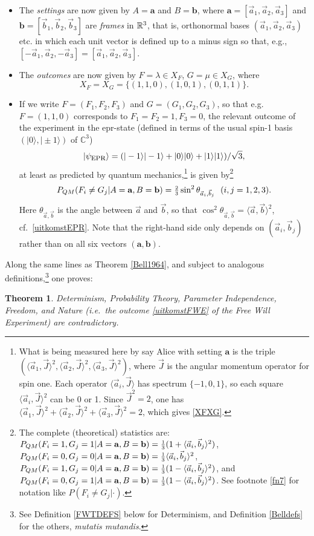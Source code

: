 \documentclass[12pt]{article}
\newtheorem{Theorem}[Definition]{Theorem}
\newcommand{\epr}{{\sc epr}}
\newcommand{\tthird}{\mbox{\footnotesize $\frac{2}{3}$}}
\newcommand{\third}{\mbox{\footnotesize $\frac{1}{3}$}}
\newcommand{\beq}{\begin{equation}}
\newcommand{\eeq}{\end{equation}}
\newcommand{\qm}{quantum mechanics}
\newcommand{\la}{\langle} \newcommand{\ra}{\rangle}
\newcommand{\er}{\eqref}
\newcommand{\lm}{\lambda} \newcommand{\Lm}{\Lambda}
\newcommand{\C}{{\mathbb C}} \newcommand{\D}{{\mathbb D}}
\newcommand{\ba}{\mathbf{a}}\newcommand{\bb}{\mathbf{b}}
\begin{document}
\begin{itemize}
\item The \emph{settings} are now given by $A=\ba$ and $B=\bb$, where
$\ba=[\vec{a}_1,\vec{a}_2,\vec{a}_3]$ and  $\bb=[\vec{b}_1,\vec{b}_2,\vec{b}_3]$
 are \emph{frames} in ${\mathbb R}^3$, that is, orthonormal bases $(\vec{a}_1,\vec{a}_2,\vec{a}_3)$ etc. in which each unit vector is defined up to a minus sign so that, e.g., $[-\vec{a}_1,\vec{a}_2,-\vec{a}_3]=[\vec{a}_1,\vec{a}_2,\vec{a}_3]$.
\item The \emph{outcomes} are now given by $F=\lm\in X_F$, $G=\mu\in X_G$, where
\begin{equation}
X_F=X_G=\{(1,1,0), (1,0,1), (0,1,1)\}. \label{XFXG}
\end{equation}
\item If we write $F=(F_1,F_2,F_3)$ and $G=(G_1,G_2,G_3)$, so that e.g.\ $F=(1,1,0)$ corresponds to $F_1=F_2=1, F_3=0$, the relevant outcome of the experiment in the \epr-state (defined in terms of the usual spin-1 basis $(|0\ra,|\pm 1\ra)$ of $\C^3$)
\beq|\psi_{\mbox{\sc epr}}\ra=(|-1\ra|-1\ra+|0\ra|0\ra+|1\ra|1\ra)/\sqrt{3},\eeq
at least as predicted by \qm,\footnote{What is being measured here by say Alice with setting $\ba$ is the triple
$(\la\vec{a}_1,\vec{J}\ra^2,\la\vec{a}_2,\vec{J}\ra^2,\la\vec{a}_3,\vec{J}\ra^2)$, where $\vec{J}$ is the angular momentum operator for spin one. Each operator $\la\vec{a}_i,\vec{J}\ra$ has spectrum $\{-1, 0,1\}$, so  each square $\la\vec{a}_i,\vec{J}\ra^2$ can be 0 or 1. Since $\vec{J}^2=2$, one has
$\la\vec{a}_1,\vec{J}\ra^2+\la\vec{a}_2,\vec{J}\ra^2+\la\vec{a}_3,\vec{J}\ra^2=2$, which gives \er{XFXG}.
}  is given by\footnote{
The complete (theoretical) statistics  are:  $P_{QM}(F_i=1,G_j=1|A=\ba,B=\bb) =\third(1+\la\vec{a}_i,\vec{b}_j\ra^2)$,\\
$P_{QM}(F_i=0,G_j=0|A=\ba,B=\bb)= \third\la\vec{a}_i,\vec{b}_j\ra^2$, 
$P_{QM}(F_i=1,G_j=0|A=\ba,B=\bb)=  \third(1-\la\vec{a}_i,\vec{b}_j\ra^2)$, and 
$P_{QM}(F_i=0,G_j=1|A=\ba,B=\bb)= \third(1-\la\vec{a}_i,\vec{b}_j\ra^2)$. See footnote \ref{fn7} for  notation like $P(F_i\neq G_j|\cdot)$.
}
\begin{equation}
P_{QM}(F_i\neq G_j|A=\ba,B=\bb)=\tthird \sin^2\theta_{\vec{a}_i,\vec{b}_j} \:\:\: (i,j=1,2,3). \label{uitkomstFWE} 
\end{equation}
Here $\theta_{\vec{a},\vec{b}}$ is the angle between $\vec{a}$ and $\vec{b}$, so that $\cos^2 \theta_{\vec{a},\vec{b}}=\la\vec{a},\vec{b}\ra^2$, cf.\ \er{uitkomstEPR}.
Note that the right-hand side only depends on $(\vec{a}_i,\vec{b}_j)$ rather than on all six vectors $(\ba,\bb)$.
\end{itemize}
Along the same lines as Theorem \ref{Bell1964}, and subject to analogous definitions,\footnote{See Definition \ref{FWTDEFS} below for Determinism, and Definition \ref{Belldefs} for the others, \emph{mutatis mutandis}.} one  proves:
\begin{Theorem}\label{BellFWT}
Determinism, Probability Theory,  Parameter Independence, Freedom,  and Nature (i.e.\ the outcome \er{uitkomstFWE} of the Free Will Experiment) are contradictory.
\end{Theorem}
\end{document}
